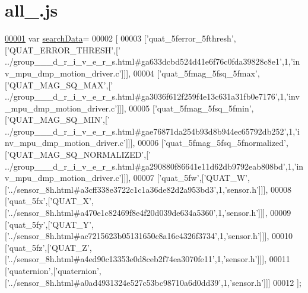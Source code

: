 \hypertarget{all__11_8js_source}{}\section{all\+\_.\+js}
\label{all__11_8js_source}

\begin{DoxyCode}
\hypertarget{all__11_8js_source.tex_l00001}{}\hyperlink{all__11_8js_ad01a7523f103d6242ef9b0451861231e}{00001} var \hyperlink{all__11_8js_ad01a7523f103d6242ef9b0451861231e}{searchData}=
00002 [
00003   [\textcolor{stringliteral}{'quat\_5ferror\_5fthresh'},[\textcolor{stringliteral}{'QUAT\_ERROR\_THRESH'},[\textcolor{stringliteral}{'
      ../group\_\_\_d\_r\_i\_v\_e\_r\_s.html#ga633dcbd524d41e6f76c0fda39828c8e1'},1,\textcolor{stringliteral}{'inv\_mpu\_dmp\_motion\_driver.c'}]]],
00004   [\textcolor{stringliteral}{'quat\_5fmag\_5fsq\_5fmax'},[\textcolor{stringliteral}{'QUAT\_MAG\_SQ\_MAX'},[\textcolor{stringliteral}{'
      ../group\_\_\_d\_r\_i\_v\_e\_r\_s.html#ga3036f612f259f4e13c631a31fb0e7176'},1,\textcolor{stringliteral}{'inv\_mpu\_dmp\_motion\_driver.c'}]]],
00005   [\textcolor{stringliteral}{'quat\_5fmag\_5fsq\_5fmin'},[\textcolor{stringliteral}{'QUAT\_MAG\_SQ\_MIN'},[\textcolor{stringliteral}{'
      ../group\_\_\_d\_r\_i\_v\_e\_r\_s.html#gae76871da254b93d8b944ec65792db252'},1,\textcolor{stringliteral}{'inv\_mpu\_dmp\_motion\_driver.c'}]]],
00006   [\textcolor{stringliteral}{'quat\_5fmag\_5fsq\_5fnormalized'},[\textcolor{stringliteral}{'QUAT\_MAG\_SQ\_NORMALIZED'},[\textcolor{stringliteral}{'
      ../group\_\_\_d\_r\_i\_v\_e\_r\_s.html#ga290880f86641e11d62db9792eab808bd'},1,\textcolor{stringliteral}{'inv\_mpu\_dmp\_motion\_driver.c'}]]],
00007   [\textcolor{stringliteral}{'quat\_5fw'},[\textcolor{stringliteral}{'QUAT\_W'},[\textcolor{stringliteral}{'../sensor\_8h.html#a3cff338e3722c1c1a36de82d2a953bd3'},1,\textcolor{stringliteral}{'sensor.h'}]]],
00008   [\textcolor{stringliteral}{'quat\_5fx'},[\textcolor{stringliteral}{'QUAT\_X'},[\textcolor{stringliteral}{'../sensor\_8h.html#a470e1c82469f8e4f20d039de634a5360'},1,\textcolor{stringliteral}{'sensor.h'}]]],
00009   [\textcolor{stringliteral}{'quat\_5fy'},[\textcolor{stringliteral}{'QUAT\_Y'},[\textcolor{stringliteral}{'../sensor\_8h.html#ac7215623b05131650c8a16e4326f3734'},1,\textcolor{stringliteral}{'sensor.h'}]]],
00010   [\textcolor{stringliteral}{'quat\_5fz'},[\textcolor{stringliteral}{'QUAT\_Z'},[\textcolor{stringliteral}{'../sensor\_8h.html#a4ed90c13353e0d8ceb2f74ea3070fe11'},1,\textcolor{stringliteral}{'sensor.h'}]]],
00011   [\textcolor{stringliteral}{'quaternion'},[\textcolor{stringliteral}{'quaternion'},[\textcolor{stringliteral}{'../sensor\_8h.html#a0ad4931324e527c53bc98710a6d0dd39'},1,\textcolor{stringliteral}{'sensor.h'}]]]
00012 ];
\end{DoxyCode}
